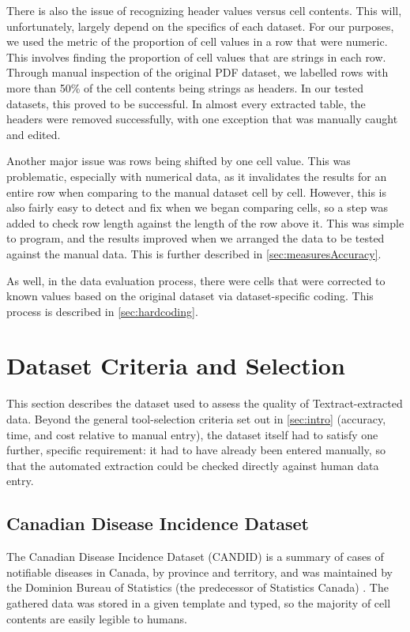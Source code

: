\documentclass[12pt]{article}
\begin{document}
There is also the issue of recognizing header values versus cell contents. This will, unfortunately, largely depend on the specifics of each dataset. For our purposes, we used the metric of the proportion of cell values in a row that were numeric. This involves finding the proportion of cell values that are strings in each row. Through manual inspection of the original PDF dataset, we labelled rows with more than 50\% of the cell contents being strings as headers. In our tested datasets, this proved to be successful. In almost every extracted table, the headers were removed successfully, with one exception that was manually caught and edited.

Another major issue was rows being shifted by one cell value. This was problematic, especially with numerical data, as it invalidates the results for an entire row when comparing to the manual dataset cell by cell. However, this is also fairly easy to detect and fix when we began comparing cells, so a step was added to check row length against the length of the row above it. This was simple to program, and the results improved when we arranged the data to be tested against the manual data. This is further described in \cref{sec:measuresAccuracy}.

As well, in the data evaluation process, there were cells that were corrected to known values based on the original dataset via dataset-specific coding. This process is described in \cref{sec:hardcoding}.



\section{Dataset Criteria and Selection}

This section describes the dataset used to assess the quality of Textract-extracted data. Beyond the general tool-selection criteria set out in \cref{sec:intro} (accuracy, time, and cost relative to manual entry), the dataset itself had to satisfy one further, specific requirement: it had to have already been entered manually, so that the automated extraction could be checked directly against human data entry.


\subsection{Canadian Disease Incidence Dataset}\label{sec:NDDdetails}

The Canadian Disease Incidence Dataset (CANDID) is a summary of cases of notifiable diseases in Canada, by province and territory, and was maintained by the Dominion Bureau of Statistics (the predecessor of Statistics Canada) \cite{CANDID}. The gathered data was stored in a given template and typed, so the majority of cell contents are easily legible to humans.
\end{document}
